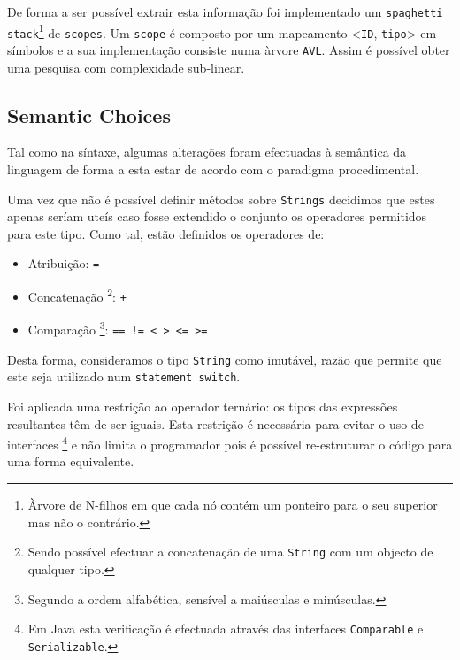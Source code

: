 \documentclass[a4paper]{article}
\begin{document}
\indent De forma a ser possível extrair esta informação foi implementado um \texttt{spaghetti stack}\footnote[1]{Àrvore de N-filhos em que cada nó contém um ponteiro para o seu superior mas não o contrário.} de \texttt{scopes}.
Um \texttt{scope} é composto por um mapeamento <\texttt{ID}, \texttt{tipo}> em símbolos e a sua implementação consiste numa àrvore \texttt{AVL}. Assim é 
possível obter uma pesquisa com complexidade sub-linear.

\subsection{Semantic Choices}
\indent \indent Tal como na síntaxe, algumas alterações foram efectuadas 
à semântica da linguagem de forma a esta estar de acordo com o paradigma procedimental. 

\indent Uma vez que não é possível definir métodos sobre \texttt{Strings} decidimos que estes apenas seríam uteís
caso fosse extendido o conjunto os operadores permitidos para este tipo. Como tal, estão definidos os operadores de:
\begin{itemize}
	\item Atribuição: \quad \verb!=! 
  	\item Concatenação \footnote[2]{Sendo possível efectuar a concatenação de uma \texttt{String} com um objecto de qualquer tipo.}: \quad \verb!+! 
	\item Comparação \footnote[3]{Segundo a ordem alfabética, sensível a maiúsculas e minúsculas.}: \quad \verb|== != < > <= >=|
\end{itemize}

\indent Desta forma, consideramos o tipo \texttt{String} como imutável, razão que permite que este seja utilizado num
\texttt{statement switch}.

\indent Foi aplicada uma restrição ao operador ternário: os tipos das expressões resultantes têm de ser iguais.
Esta restrição é necessária para evitar o uso de interfaces \footnote[4]{Em Java esta verificação é efectuada através das interfaces \texttt{Comparable} e \texttt{Serializable}.}
e não limita o programador pois é possível re-estruturar o código para uma forma equivalente.

\cleardoublepage
\end{document}
